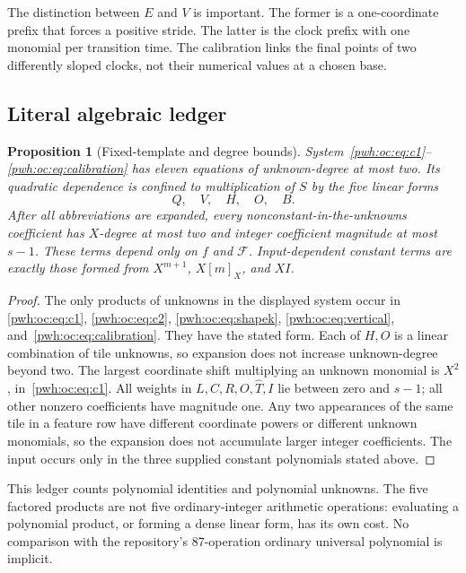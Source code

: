 \documentclass[11pt,letterpaper]{article}
\numberwithin{equation}{section}
\newtheorem{proposition}[theorem]{Proposition}
\theoremstyle{definition}
\newcommand{\F}{\mathcal F}
\newcommand{\rep}[1]{[#1]_X}
\begin{document}
The distinction between $E$ and $V$ is important. The former is a
one-coordinate prefix that forces a positive stride. The latter is the
clock prefix with one monomial per transition time. The calibration
links the final points of two differently sloped clocks, not their
numerical values at a chosen base.

\subsection{Literal algebraic ledger}

\begin{proposition}[Fixed-template and degree bounds]
\label{pwh:oc:prop:ledger}
System~\eqref{pwh:oc:eq:c1}--\eqref{pwh:oc:eq:calibration} has eleven equations of
unknown-degree at most two. Its quadratic dependence is confined to
multiplication of $S$ by the five linear forms
\[
 Q,\quad V,\quad H,\quad O,\quad B.
\]
After all abbreviations are expanded, every nonconstant-in-the-unknowns
coefficient has $X$-degree at most two and integer coefficient magnitude
at most $s-1$. These terms depend only on $f$ and $\F$. Input-dependent
constant terms are exactly those formed from $X^{m+1}$, $X\rep m$, and
$XI$.
\end{proposition}

\begin{proof}
The only products of unknowns in the displayed system occur in
\eqref{pwh:oc:eq:c1}, \eqref{pwh:oc:eq:c2}, \eqref{pwh:oc:eq:shapek}, \eqref{pwh:oc:eq:vertical},
and~\eqref{pwh:oc:eq:calibration}. They have the stated form. Each of
$H,O$ is a linear combination of tile unknowns, so expansion does not
increase unknown-degree beyond two. The largest coordinate shift
multiplying an unknown monomial is $X^2$, in~\eqref{pwh:oc:eq:c1}.
All weights in $L,C,R,O,\widehat T,I$ lie between zero and $s-1$;
all other nonzero coefficients have magnitude one. Any two appearances
of the same tile in a feature row have different coordinate powers or
different unknown monomials, so the expansion does not accumulate larger
integer coefficients. The input occurs only in the three supplied
constant polynomials stated above.
\end{proof}

This ledger counts polynomial identities and polynomial unknowns.
The five factored products are not five ordinary-integer arithmetic
operations: evaluating a polynomial product, or forming a dense linear
form, has its own cost. No comparison with the repository's 87-operation
ordinary universal polynomial is implicit.
\end{document}
